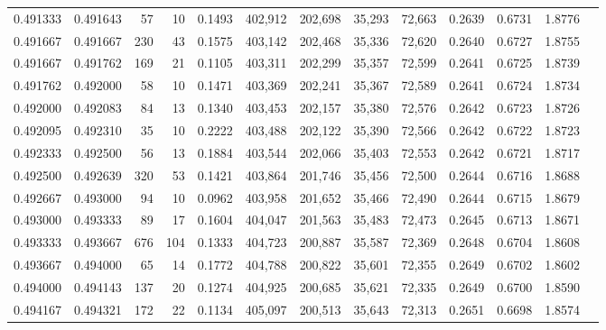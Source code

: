 \begin{tabular}{rrrrrrrrrrrrr}
0.491333 & 0.491643 &    57 &  10 &                                     0.1493 & 402,912 & 202,698 &  35,293 &  72,663 & 0.2639 & 0.6731 & 1.8776 \\
0.491667 & 0.491667 &   230 &  43 &                                     0.1575 & 403,142 & 202,468 &  35,336 &  72,620 & 0.2640 & 0.6727 & 1.8755 \\
0.491667 & 0.491762 &   169 &  21 &                                     0.1105 & 403,311 & 202,299 &  35,357 &  72,599 & 0.2641 & 0.6725 & 1.8739 \\
0.491762 & 0.492000 &    58 &  10 &                                     0.1471 & 403,369 & 202,241 &  35,367 &  72,589 & 0.2641 & 0.6724 & 1.8734 \\
0.492000 & 0.492083 &    84 &  13 &                                     0.1340 & 403,453 & 202,157 &  35,380 &  72,576 & 0.2642 & 0.6723 & 1.8726 \\
0.492095 & 0.492310 &    35 &  10 &                                     0.2222 & 403,488 & 202,122 &  35,390 &  72,566 & 0.2642 & 0.6722 & 1.8723 \\
0.492333 & 0.492500 &    56 &  13 &                                     0.1884 & 403,544 & 202,066 &  35,403 &  72,553 & 0.2642 & 0.6721 & 1.8717 \\
0.492500 & 0.492639 &   320 &  53 &                                     0.1421 & 403,864 & 201,746 &  35,456 &  72,500 & 0.2644 & 0.6716 & 1.8688 \\
0.492667 & 0.493000 &    94 &  10 &                                     0.0962 & 403,958 & 201,652 &  35,466 &  72,490 & 0.2644 & 0.6715 & 1.8679 \\
0.493000 & 0.493333 &    89 &  17 &                                     0.1604 & 404,047 & 201,563 &  35,483 &  72,473 & 0.2645 & 0.6713 & 1.8671 \\
0.493333 & 0.493667 &   676 & 104 &                                     0.1333 & 404,723 & 200,887 &  35,587 &  72,369 & 0.2648 & 0.6704 & 1.8608 \\
0.493667 & 0.494000 &    65 &  14 &                                     0.1772 & 404,788 & 200,822 &  35,601 &  72,355 & 0.2649 & 0.6702 & 1.8602 \\
0.494000 & 0.494143 &   137 &  20 &                                     0.1274 & 404,925 & 200,685 &  35,621 &  72,335 & 0.2649 & 0.6700 & 1.8590 \\
0.494167 & 0.494321 &   172 &  22 &                                     0.1134 & 405,097 & 200,513 &  35,643 &  72,313 & 0.2651 & 0.6698 & 1.8574 \\

\end{tabular}
